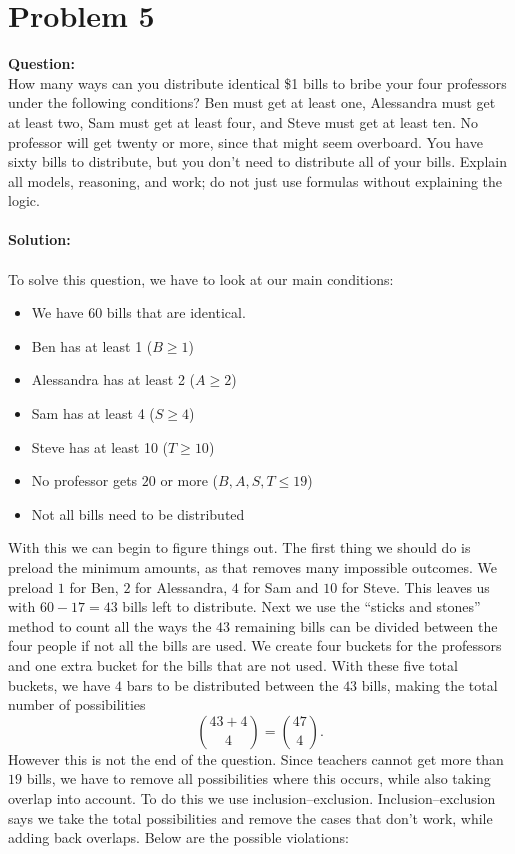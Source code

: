 \documentclass{article}
\begin{document}
\section*{Problem 5}
\textbf{Question:}\\ 
How many ways can you distribute identical \$1 bills to bribe your four professors under the following conditions? Ben must get at least one, Alessandra must get at least two, Sam must get at least four, and Steve must get at least ten. No professor will get twenty or more, since that might seem overboard. You have sixty bills to distribute, but you don't need to distribute all of your bills. Explain all models, reasoning, and work; do not just use formulas without explaining the logic.   \\\\
\textbf{Solution:}\\\\
To solve this question, we have to look at our main conditions: 
\begin{itemize}
    \item We have 60 bills that are identical.
    \item Ben has at least 1 ($B\ge1$)
    \item Alessandra has at least 2 ($A\ge2$)
    \item Sam has at least 4 ($S\ge4$)
    \item Steve has at least 10 ($T\ge10$)
    \item No professor gets $20$ or more ($B,A,S,T\le19$)
    \item Not all bills need to be distributed
\end{itemize}
With this we can begin to figure things out. The first thing we should do is preload the minimum amounts, as that removes many impossible outcomes. We preload $1$ for Ben, $2$ for Alessandra, $4$ for Sam and $10$ for Steve. This leaves us with $60-17 = 43$ bills left to distribute.
Next we use the “sticks and stones” method to count all the ways the $43$ remaining bills can be divided between the four people if not all the bills are used. We create four buckets for the professors and one extra bucket for the bills that are not used. With these five total buckets, we have $4$ bars to be distributed between the $43$ bills, making the total number of possibilities
\[
\binom{43+4}{4}=\binom{47}{4}.
\]
However this is not the end of the question. Since teachers cannot get more than $19$ bills, we have to remove all possibilities where this occurs, while also taking overlap into account. To do this we use inclusion–exclusion. Inclusion–exclusion says we take the total possibilities and remove the cases that don’t work, while adding back overlaps. Below are the possible violations:
\end{document}
